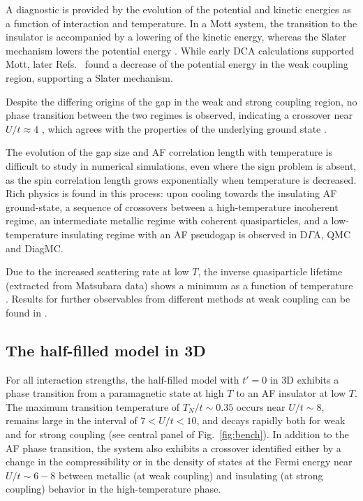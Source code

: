 \documentclass{ar-1col}
\begin{document}
A diagnostic is provided by the evolution of the potential and kinetic energies as a function of interaction and temperature. In a Mott system, the transition to the insulator is accompanied by a lowering of the kinetic energy, whereas the Slater mechanism lowers the potential energy \cite{Gull08,Rohringer16}.
While early DCA calculations \cite{Moukouri01} supported Mott, later Refs.~\cite{Gull08,Schafer15,Rohringer16,Kim20} found a decrease of the potential energy in the weak coupling region, supporting a Slater mechanism.\begin{marginnote}
\end{marginnote}
Despite the differing origins of the gap in the weak and strong coupling region, 
no phase transition between the two regimes is observed, indicating a crossover near $U/t\!\approx\!4$ \cite{Vitali16,Kim20}, which agrees with the properties of the underlying ground state \cite{Borejsza04}.

The evolution of the gap size and AF correlation length with temperature is difficult to study in numerical simulations, even where
the sign problem is absent, as the spin correlation length grows exponentially when temperature is decreased. Rich physics is found in
this process: upon cooling towards the insulating AF ground-state, a sequence of crossovers between a high-temperature incoherent regime, an intermediate metallic regime with coherent quasiparticles, and a low-temperature insulating regime with an AF pseudogap \cite{Schafer15,Simkovic20,Kim20} is observed in D$\Gamma$A, QMC and DiagMC.\begin{marginnote}
\end{marginnote}Due to the increased scattering rate at low $T$, the inverse quasiparticle lifetime (extracted from Matsubara data) shows a minimum as a function of temperature \cite{Rohringer16,Schaefer21B}. Results for further observables from different methods at weak coupling can be found in \cite{Schaefer21A}.
	
\subsection{The half-filled model in 3D}
For all interaction strengths, the half-filled model with $t'\!=\!0$ in 3D exhibits a phase transition from a paramagnetic state at high $T$ to an AF insulator at low $T$. The maximum transition temperature of $T_N/t\!\sim\!0.35$ occurs near $U/t\!\sim\!8$, remains large in the interval of $7\!<\!U/t\!<\!10$, and decays rapidly both for weak and for strong coupling \cite{Scalettar89B,Staudt00,Kent05,Rohringer11,Rohringer18} (see central panel of Fig.~\ref{fig:bench}). In addition to the AF phase transition, the system also exhibits a crossover identified either by a change in the compressibility or in the density of states at the Fermi energy near $U/t\!\sim\!6-8$ \cite{Staudt00,Fuchs11B} between metallic (at weak coupling) and insulating (at strong coupling) behavior in the high-temperature phase.
\end{document}
